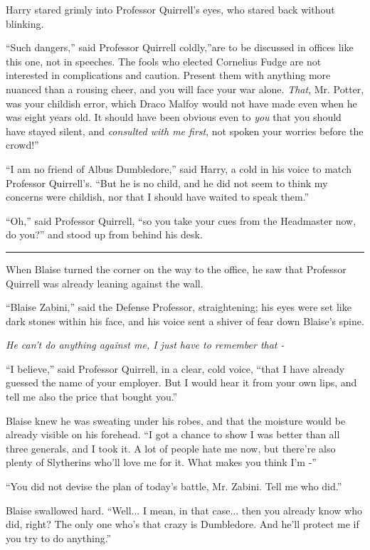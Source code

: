 Harry stared grimly into Professor Quirrell's eyes, who stared back
without blinking.

``Such dangers,'' said Professor Quirrell coldly,''are to be discussed
in offices like this one, not in speeches. The fools who elected
Cornelius Fudge are not interested in complications and caution. Present
them with anything more nuanced than a rousing cheer, and you will face
your war alone. \emph{That}, Mr. Potter, was your childish error, which
Draco Malfoy would not have made even when he was eight years old. It
should have been obvious even to \emph{you} that you should have stayed
silent, and \emph{consulted with me first}, not spoken your worries
before the crowd!''

``I am no friend of Albus Dumbledore,'' said Harry, a cold in his voice
to match Professor Quirrell's. ``But he is no child, and he did not seem
to think my concerns were childish, nor that I should have waited to
speak them.''

``Oh,'' said Professor Quirrell, ``so you take your cues from the
Headmaster now, do you?'' and stood up from behind his desk.

\begin{center}\rule{3in}{0.4pt}\end{center}

When Blaise turned the corner on the way to the office, he saw that
Professor Quirrell was already leaning against the wall.

``Blaise Zabini,'' said the Defense Professor, straightening; his eyes
were set like dark stones within his face, and his voice sent a shiver
of fear down Blaise's spine.

\emph{He can't do anything against me, I just have to remember that -}

``I believe,'' said Professor Quirrell, in a clear, cold voice, ``that I
have already guessed the name of your employer. But I would hear it from
your own lips, and tell me also the price that bought you.''

Blaise knew he was sweating under his robes, and that the moisture would
be already visible on his forehead. ``I got a chance to show I was
better than all three generals, and I took it. A lot of people hate me
now, but there're also plenty of Slytherins who'll love me for it. What
makes you think I'm -''

``You did not devise the plan of today's battle, Mr. Zabini. Tell me who
did.''

Blaise swallowed hard. ``Well... I mean, in that case... then
you already know who did, right? The only one who's that crazy is
Dumbledore. And he'll protect me if you try to do anything.''

